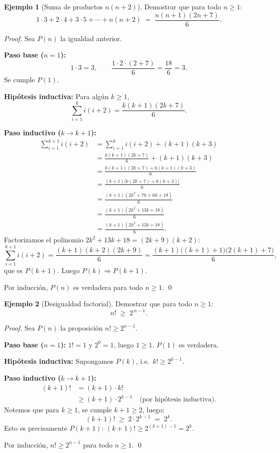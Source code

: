 \documentclass[11pt,a4paper]{article}
\theoremstyle{definition}
\theoremstyle{plain}
\theoremstyle{definition}
\newtheorem{ejemplo}{Ejemplo}[section]
\theoremstyle{definition}
\theoremstyle{remark}
\newcommand{\implica}{\Rightarrow}         %
\begin{document}
\begin{ejemplo}[Suma de productos $n(n+2)$]
\label{ej:sumann2}
Demostrar que para todo $n \geq 1$:
\[
1\cdot 3 + 2\cdot 4 + 3\cdot 5 + \cdots + n(n+2) \;=\;
\frac{n(n+1)(2n+7)}{6}.
\]

\begin{proof}
Sea $P(n)$ la igualdad anterior.

\noindent\textbf{Paso base ($n=1$):}
\[
1\cdot 3 = 3, \qquad
\frac{1\cdot 2 \cdot (2+7)}{6} = \frac{18}{6} = 3.
\]
Se cumple $P(1)$.

\noindent\textbf{Hip\'otesis inductiva:} Para alg\'un $k\geq 1$,
\[
\sum_{i=1}^{k} i(i+2) = \frac{k(k+1)(2k+7)}{6}.
\]

\noindent\textbf{Paso inductivo ($k\to k+1$):}
\[
\begin{aligned}
\sum_{i=1}^{k+1} i(i+2)
&= \sum_{i=1}^{k} i(i+2) + (k+1)(k+3) \\
&= \frac{k(k+1)(2k+7)}{6} + (k+1)(k+3) \\
&= \frac{k(k+1)(2k+7) + 6(k+1)(k+3)}{6} \\
&= \frac{(k+1)\bigl[k(2k+7) + 6(k+3)\bigr]}{6} \\
&= \frac{(k+1)(2k^2 + 7k + 6k + 18)}{6} \\
&= \frac{(k+1)(2k^2 + 13k + 18)}{6} \\
&= \frac{(k+1)(2k^2 + 13k + 18)}{6}.
\end{aligned}
\]
Factorizamos el polinomio $2k^2+13k+18 = (2k+9)(k+2)$:
\[
\sum_{i=1}^{k+1} i(i+2)
= \frac{(k+1)(k+2)(2k+9)}{6}
= \frac{(k+1)\bigl((k+1)+1\bigr)\bigl(2(k+1)+7\bigr)}{6},
\]
que es $P(k+1)$. Luego $P(k)\implica P(k+1)$.

\noindent Por inducci\'on, $P(n)$ es verdadera para todo $n\geq 1$.
\qed
\end{proof}
\end{ejemplo}

\begin{ejemplo}[Desigualdad factorial]
\label{ej:factorial}
Demostrar que para todo $n \geq 1$:
\[
n! \;\geq\; 2^{\,n-1}.
\]

\begin{proof}
Sea $P(n)$ la proposici\'on $n! \geq 2^{n-1}$.

\noindent\textbf{Paso base ($n=1$):}
$1! = 1$ y $2^{0} = 1$, luego $1 \geq 1$. $P(1)$ es verdadera.

\noindent\textbf{Hip\'otesis inductiva:} Supongamos $P(k)$, i.e.\ $k! \geq 2^{k-1}$.

\noindent\textbf{Paso inductivo ($k \to k+1$):}
\[
\begin{aligned}
(k+1)! &= (k+1) \cdot k! \\
      &\geq (k+1) \cdot 2^{k-1} \quad\text{(por hip\'otesis inductiva)}.
\end{aligned}
\]
Notemos que para $k \geq 1$, se cumple $k+1 \geq 2$, luego:
\[
(k+1)! \;\geq\; 2 \cdot 2^{k-1} \;=\; 2^{k}.
\]
Esto es precisamente $P(k+1)$: $(k+1)! \geq 2^{(k+1)-1} = 2^{k}$.

\noindent Por inducci\'on, $n! \geq 2^{n-1}$ para todo $n \geq 1$.
\qed
\end{proof}
\end{ejemplo}
\end{document}
